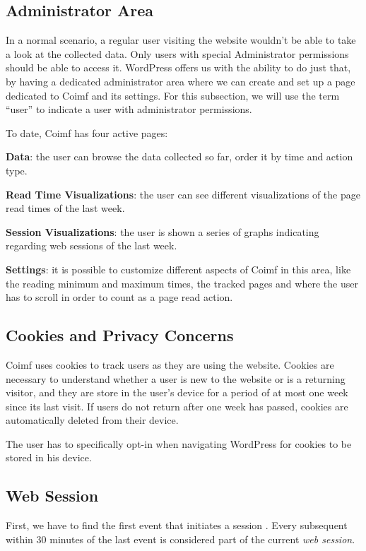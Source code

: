 \documentclass[sigconf,nonacm]{acmart}
\begin{document}
\subsection{Administrator Area}

In a normal scenario, a regular user visiting the website wouldn't be able to
take a look at the collected data. Only users with special Administrator
permissions should be able to access it. WordPress offers us with the ability to
do just that, by having a dedicated administrator area where we can create and
set up a page dedicated to Coimf and its settings. For this subsection, we will
use the term ``user'' to indicate a user with administrator permissions.

To date, Coimf has four active pages:

\textbf{Data}: the user can browse the data collected so far, order it by time and
action type.

\textbf{Read Time Visualizations}: the user can see different visualizations of
the page read times of the last week.

\textbf{Session Visualizations}: the user is shown a series of graphs indicating
regarding web sessions of the last week.

\textbf{Settings}: it is possible to customize different aspects of Coimf in
this area, like the reading minimum and maximum times, the tracked pages and
where the user has to scroll in order to count as a page read action.

\subsection{Cookies and Privacy Concerns}

Coimf uses cookies to track users as they are using the website. Cookies are necessary
to understand whether a user is new to the website or is a returning visitor, and they
are store in the user's device for a period of at most one week since its last visit.
If users do not return after one week has passed, cookies are automatically deleted
from their device.

The user has to specifically opt-in when navigating WordPress for cookies to be
stored in his device.

\subsection{Web Session}

First, we have to find the first event that initiates a session
\cite{liu2010personalized, gulla2017adressa}. Every
subsequent within 30 minutes of the last event is considered part of the current
\textit{web session}.
\end{document}
